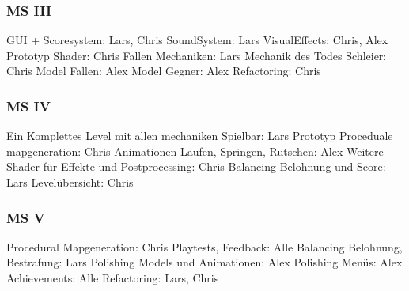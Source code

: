 \documentclass[12pt]{article}
\begin{document}
\vspace{1cm}
\subsubsection{MS III}

GUI + Scoresystem: Lars, Chris\newline
SoundSystem: Lars\newline
VisualEffects: Chris, Alex\newline
Prototyp Shader: Chris\newline
Fallen Mechaniken: Lars\newline
Mechanik des Todes Schleier: Chris\newline
Model Fallen: Alex\newline
Model Gegner: Alex\newline
Refactoring: Chris\newline

\vspace{1cm}
\subsubsection{MS IV}

Ein Komplettes Level mit allen mechaniken Spielbar: Lars\newline
Prototyp Proceduale mapgeneration: Chris\newline
Animationen Laufen, Springen, Rutschen: Alex\newline
Weitere Shader für Effekte und Postprocessing: Chris\newline
Balancing Belohnung und Score: Lars\newline
Levelübersicht: Chris\newline

\vspace{1cm}
\subsubsection{MS V}

Procedural Mapgeneration: Chris\newline
Playtests, Feedback: Alle\newline
Balancing Belohnung, Bestrafung: Lars\newline
Polishing Models und Animationen: Alex\newline
Polishing Menüs: Alex\newline
Achievements: Alle\newline
Refactoring: Lars, Chris\newline
\end{document}
